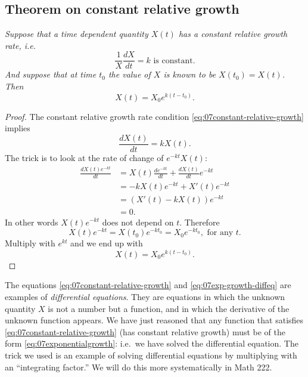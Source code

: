 \subsection{Theorem on constant relative growth}
\label{sec:07const-relative-growth}
\itshape%
Suppose that a time dependent quantity $X(t)$ has a constant relative
growth rate, i.e.
\begin{equation}
  \frac{1} {X} \frac{dX} {dt} = k \text{ is constant.}
  \label{eq:07constant-relative-growth}
\end{equation}
And suppose that at time $t_0$ the value of $X$ is known to be
$X(t_0) = X(t)$.  Then
\begin{equation}\label{eq:07exponentialgrowth}
  X(t) = X_0 e^{k(t-t_0)}.
\end{equation}
\upshape

\begin{proof}
  The constant relative growth rate condition
  \eqref{eq:07constant-relative-growth} implies
  \begin{equation}\label{eq:07exp-growth-diffeq}
    \frac{dX(t)}{dt} = kX(t).
  \end{equation}
  The trick is to look at the rate of change of $e^{-kt}X(t)$:
  \begin{align*}
    \frac{dX(t)e^{-kt}}{dt}
    &=X(t)\frac{de^{-kt}}{dt} + \frac{dX(t)}{dt}e^{-kt}\\
    &=-kX(t) e^{-kt}+X'(t)e^{-kt}\\
    &= (X'(t) - kX(t))e^{-kt} \\
    &=0.
  \end{align*}
  In other words $X(t)e^{-kt}$ does not depend on $t$.  Therefore
  \[
  X(t)e^{-kt} = X(t_0) e^{-kt_0} = X_0 e^{-kt_0}, \text{ for any $t$.}
  \]
  Multiply with $e^{kt}$ and we end up with
  \[
  X(t) = X_0e^{k(t-t_0)}.
  \]
\end{proof}
The equations \eqref{eq:07constant-relative-growth} and
\eqref{eq:07exp-growth-diffeq} are examples of \textit{differential
  equations}.  They are equations in which the unknown quantity $X$ is
not a number but a function, and in which the derivative of the
unknown function appears.  We have just reasoned that any function
that satisfies \eqref{eq:07constant-relative-growth} (has constant
relative growth) must be of the form \eqref{eq:07exponentialgrowth}:
i.e.~we have solved the differential equation.  The trick we used is
an example of solving differential equations by multiplying with an
``integrating factor.''  We will do this more systematically in Math
222.

